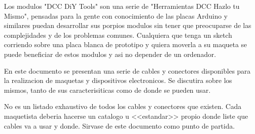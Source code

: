 
Los modulos "DCC DiY Tools" son una serie de "Herramientas DCC Hazlo tu Mismo", pensadas para la gente con conocimiento de las placas Arduino y similares
puedan desarrollar sus porpios modulos sin tener que preocuparse de las complejidades y de los problemas comunes. Cualquiera que tenga un sketch corriendo 
sobre una placa blanca de prototipo y quiera moverla a su maqueta se puede beneficiar de estos modulos y asi no depender de un ordenador. 

En este documento se presentan una serie de cables y conectores disponibles  para la realizacion de maquetas y
dispositivos electronicos. Se discutira sobre los mismos, tanto de sus caracterisiticas como de donde se pueden usar. 

No es un listado exhaustivo de todos los cables y conectores que existen. Cada maquetista deberia hacerse un catalogo u <<estandar>> propio donde liste que cables va a usar y donde. Sirvase de este documento como punto de partida.